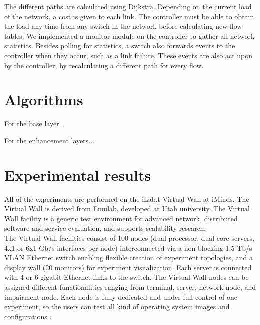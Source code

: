 \documentclass[conference]{IEEEtran}
\begin{document}
The different paths are calculated using Dijkstra. 
Depending on the current load of the network, a cost is given to each link.
The controller must be able to obtain the load any time from any switch in the network before calculating 
new flow tables. We implemented a monitor module on the controller to gather all network 
statistics. Besides polling for statistics, a switch also forwards events to the controller when 
they occur, such as a link failure. These events are also act upon by the controller, 
by recalculating a different path for every flow.\\

\section{Algorithms}

For the base layer...

For the enhancement layers... 

\section{Experimental results}

All of the experiments are performed on the iLab.t Virtual Wall at iMinds.
The Virtual Wall is derived from Emulab, developed at Utah university.
The Virtual Wall facility is a generic test environment for advanced network, 
distributed software and service evaluation, and supports scalability research.\\

The Virtual Wall facilities consist of 100 nodes 
(dual processor, dual core servers, 4x1 or 6x1 Gb/s interfaces per node)
interconnected via a non-blocking 1.5 Tb/s VLAN Ethernet switch enabling flexible creation of experiment topologies, 
and a display wall (20 monitors) for experiment visualization. 
Each server is connected with 4 or 6 gigabit Ethernet links to the switch. 
The Virtual Wall nodes can be assigned different functionalities ranging 
from terminal, server, network node, and impairment node. 
Each node is fully dedicated and under full control of one experiment, 
so the users can test all kind of operating system images and configurations \cite{virtual}.\\
\end{document}
